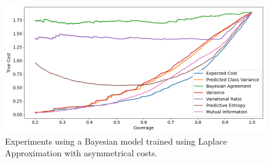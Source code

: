 \begin{figure}[h]
	\includegraphics[width=\textwidth]{images/multi-class/laplace-asym.png}
	\caption*{Experiments using a Bayesian model trained using Laplace Approximation with asymmetrical costs.}
\end{figure}